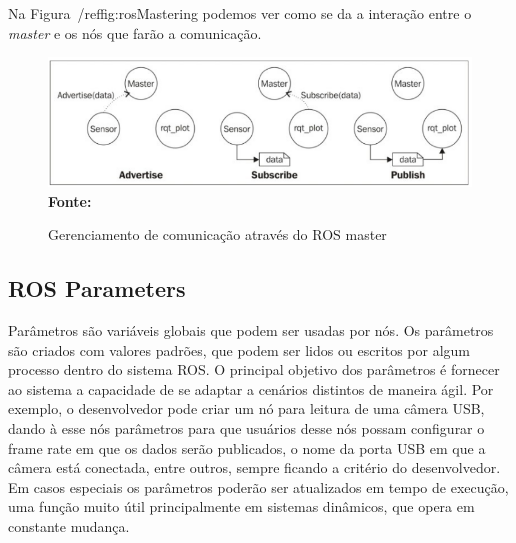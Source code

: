 Na Figura~/ref{fig:rosMastering} podemos ver como se da a interação entre o \textit{master} e os nós que farão a comunicação.


\begin{figure}[ht]
	\caption{Gerenciamento de comunicação através do ROS master}
	\begin{center}
		\includegraphics[scale=0.51]{imagens/rosmaster.png}\\
		{\small \textbf{Fonte:} }
    \end{center}\label{fig:rosMastering}
\end{figure}

\subsection{ROS Parameters}

Parâmetros são variáveis globais que podem ser usadas por nós. Os parâmetros são criados com valores padrões, que podem ser lidos ou escritos por algum processo dentro do sistema ROS\@. O principal objetivo dos parâmetros é fornecer ao sistema a capacidade de se adaptar a cenários distintos de maneira ágil. Por exemplo, o desenvolvedor pode criar um nó para leitura de uma câmera USB, dando à esse nós parâmetros para que usuários desse nós possam configurar o frame rate em que os dados serão publicados, o nome da porta USB em que a câmera está conectada, entre outros, sempre ficando a critério do desenvolvedor. Em casos especiais os parâmetros poderão ser atualizados em tempo de execução, uma função muito útil principalmente em sistemas dinâmicos, que opera em constante mudança.
